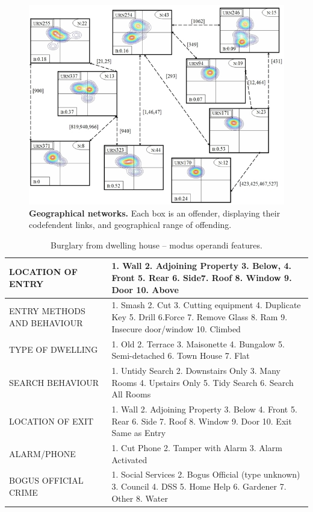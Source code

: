 \documentclass{llncs}
\begin{document}
\begin{figure}[!ht]
\centering
\includegraphics[width=0.9\columnwidth]{images/GeographicalNetworks.jpg}
\caption{{\textbf{Geographical networks.}} Each box is an offender, displaying their codefendent links, and geographical range of offending.}
\label{fig:geonets} 
\end{figure}

\begin{table}[htb]
\centering
\begin{tabularx}{\textwidth}{|X|X|}
\hline
 LOCATION OF ENTRY &  1. Wall 2. Adjoining Property 3. Below, 4. Front
 5. Rear 6. Side7. Roof 8. Window 9. Door 10. Above \\
\hline 
 ENTRY METHODS AND BEHAVIOUR & 1. Smash 2. Cut 3. Cutting equipment
 4. Duplicate Key 5. Drill 6.Force 7. Remove Glass 8. Ram 9. Insecure
 door/window 10. Climbed \\
\hline
 TYPE OF DWELLING & 1. Old 2. Terrace 3. Maisonette 4. Bungalow
 5. Semi-detached 6. Town House 7. Flat \\
\hline
 SEARCH BEHAVIOUR & 1. Untidy Search 2. Downstairs Only 3. Many Rooms
 4. Upstairs Only 5. Tidy Search 6. Search All Rooms \\
\hline
 LOCATION OF EXIT & 1. Wall 2. Adjoining Property 3. Below 4. Front
5. Rear 6. Side 7. Roof 8. Window 9. Door 10. Exit Same as Entry \\
\hline
 ALARM/PHONE & 1. Cut Phone 2. Tamper with Alarm 3. Alarm Activated \\
\hline
 BOGUS OFFICIAL CRIME & 1. Social Services 2. Bogus Official (type
 unknown) 3. Council 4. DSS 5. Home Help 6. Gardener 7. Other 8. Water
 \\
\hline
\end{tabularx}%
\caption{Burglary from dwelling house -- modus operandi features.}
\label{tab:burgdwellingsmo}
\end{table}
\end{document}
